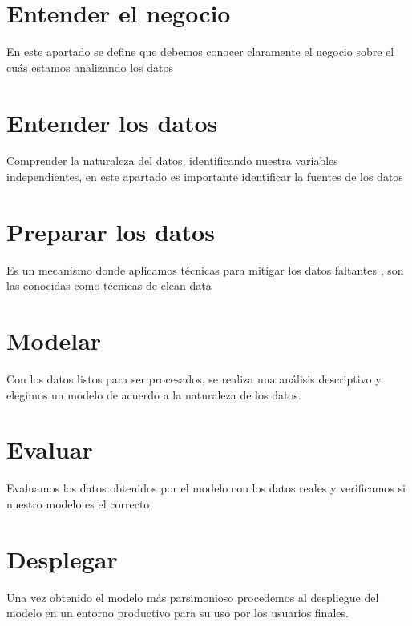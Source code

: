 \section{Entender el negocio}

En este apartado se define que debemos conocer claramente el negocio sobre el cu\'as estamos analizando los datos

\section{Entender los datos}

Comprender la naturaleza del datos, identificando nuestra variables independientes, en este apartado es importante identificar la fuentes de los datos

\section{Preparar los datos}
Es un mecanismo donde aplicamos t\'ecnicas para mitigar los datos faltantes , son las conocidas como t\'ecnicas de clean data

\section{Modelar}
Con los datos listos para ser procesados, se realiza una an\'alisis descriptivo y elegimos un modelo de acuerdo a la naturaleza de los datos.  

\section{Evaluar}
Evaluamos los datos obtenidos por el modelo con los datos reales y verificamos si nuestro modelo es el correcto

\section{Desplegar}
Una vez obtenido el modelo m\'as parsimonioso procedemos al despliegue del modelo en un entorno productivo para su uso por los usuarios finales.


